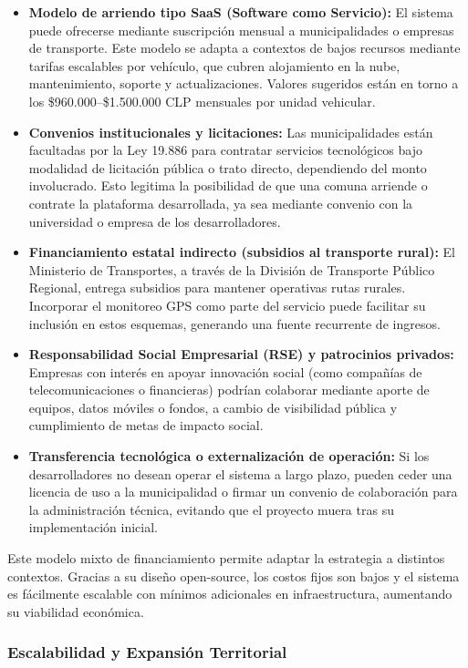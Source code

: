 \documentclass[12pt]{article}
\begin{document}
\begin{itemize}
    \item \textbf{Modelo de arriendo tipo SaaS (Software como Servicio):} El sistema puede ofrecerse mediante suscripción mensual a municipalidades o empresas de transporte. Este modelo se adapta a contextos de bajos recursos mediante tarifas escalables por vehículo, que cubren alojamiento en la nube, mantenimiento, soporte y actualizaciones. Valores sugeridos están en torno a los \$960.000–\$1.500.000 CLP mensuales por unidad vehicular.
    \item \textbf{Convenios institucionales y licitaciones:} Las municipalidades están facultadas por la Ley 19.886 para contratar servicios tecnológicos bajo modalidad de licitación pública o trato directo, dependiendo del monto involucrado. Esto legitima la posibilidad de que una comuna arriende o contrate la plataforma desarrollada, ya sea mediante convenio con la universidad o empresa de los desarrolladores.
    \item \textbf{Financiamiento estatal indirecto (subsidios al transporte rural):} El Ministerio de Transportes, a través de la División de Transporte Público Regional, entrega subsidios para mantener operativas rutas rurales. Incorporar el monitoreo GPS como parte del servicio puede facilitar su inclusión en estos esquemas, generando una fuente recurrente de ingresos.
    \item \textbf{Responsabilidad Social Empresarial (RSE) y patrocinios privados:} Empresas con interés en apoyar innovación social (como compañías de telecomunicaciones o financieras) podrían colaborar mediante aporte de equipos, datos móviles o fondos, a cambio de visibilidad pública y cumplimiento de metas de impacto social.
    \newpage
    \item \textbf{Transferencia tecnológica o externalización de operación:} Si los desarrolladores no desean operar el sistema a largo plazo, pueden ceder una licencia de uso a la municipalidad o firmar un convenio de colaboración para la administración técnica, evitando que el proyecto muera tras su implementación inicial.
\end{itemize}
Este modelo mixto de financiamiento permite adaptar la estrategia a distintos contextos. Gracias a su diseño open-source, los costos fijos son bajos y el sistema es fácilmente escalable con mínimos adicionales en infraestructura, aumentando su viabilidad económica.\\

\subsubsection{Escalabilidad y Expansión Territorial}
\end{document}

